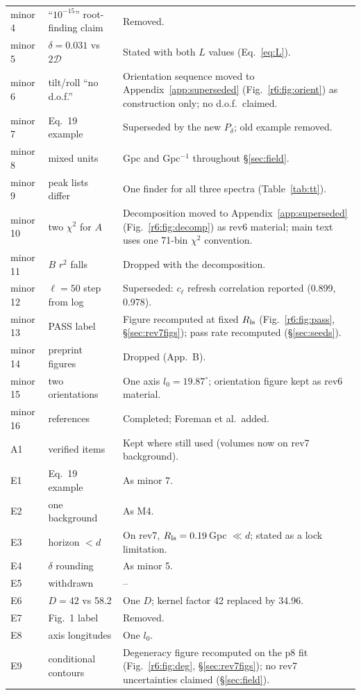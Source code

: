 \documentclass[11pt]{article}
\begin{document}
\begin{longtable}{@{}p{1.3cm}p{5.2cm}p{8.6cm}@{}}
minor 4 & ``$10^{-15}$'' root-finding claim & Removed.\\
minor 5 & $\delta=0.031$ vs $2\mathcal D$ & Stated with both $L$ values (Eq.~\ref{eq:L}).\\
minor 6 & tilt/roll ``no d.o.f.'' & Orientation sequence moved to Appendix~\ref{app:superseded} (Fig.~\ref{r6:fig:orient}) as construction only; no d.o.f.\ claimed.\\
minor 7 & Eq.~19 example & Superseded by the new $P_\delta$; old example removed.\\
minor 8 & mixed units & Gpc and Gpc$^{-1}$ throughout \S\ref{sec:field}.\\
minor 9 & peak lists differ & One finder for all three spectra (Table~\ref{tab:tt}).\\
minor 10 & two $\chi^2$ for $A$ & Decomposition moved to Appendix~\ref{app:superseded} (Fig.~\ref{r6:fig:decomp}) as rev6 material; main text uses one 71-bin $\chi^2$ convention.\\
minor 11 & $B$ $r^2$ falls & Dropped with the decomposition.\\
minor 12 & $\ell=50$ step from log & Superseded: $c_\ell$ refresh correlation reported (0.899, 0.978).\\
minor 13 & PASS label & Figure recomputed at fixed $R_{\rm ls}$ (Fig.~\ref{r6:fig:pass}, \S\ref{sec:rev7figs}); pass rate recomputed (\S\ref{sec:seeds}).\\
minor 14 & preprint figures & Dropped (App.~B).\\
minor 15 & two orientations & One axis $l_0=19.87^\circ$; orientation figure kept as rev6 material.\\
minor 16 & references & Completed; Foreman et al.\ added.\\
A1 & verified items & Kept where still used (volumes now on rev7 background).\\
E1 & Eq.~19 example & As minor 7.\\
E2 & one background & As M4.\\
E3 & horizon $<d$ & On rev7, $R_{\rm ls}=0.19$\,Gpc $\ll d$; stated as a lock limitation.\\
E4 & $\delta$ rounding & As minor 5.\\
E5 & withdrawn & --\\
E6 & $D=42$ vs 58.2 & One $D$; kernel factor 42 replaced by 34.96.\\
E7 & Fig.~1 label & Removed.\\
E8 & axis longitudes & One $l_0$.\\
E9 & conditional contours & Degeneracy figure recomputed on the p8 fit (Fig.~\ref{r6:fig:deg}, \S\ref{sec:rev7figs}); no rev7 uncertainties claimed (\S\ref{sec:field}).\\

\end{longtable}
\end{document}
